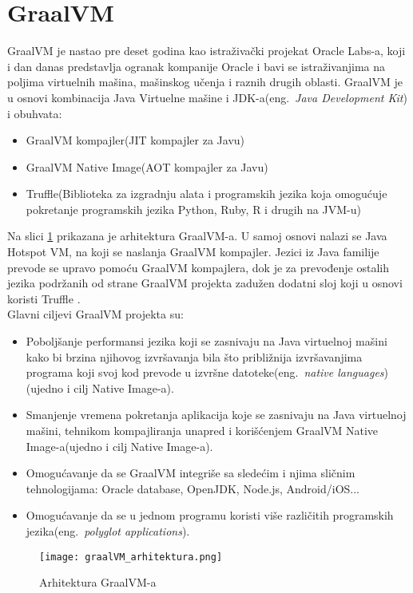 \documentclass[a4paper]{article}
\begin{document}
\section{GraalVM}
\label{sec:graalvm}
GraalVM je nastao pre deset godina kao istraživački projekat Oracle Labs-a, koji i dan danas predstavlja ogranak kompanije Oracle i bavi se istraživanjima na poljima virtuelnih mašina, mašinskog učenja i raznih drugih oblasti.
GraalVM je u osnovi kombinacija Java Virtuelne mašine i JDK-a(eng.~{\em Java Development Kit}) i obuhvata:
\begin{itemize}
    \item GraalVM kompajler(JIT kompajler za Javu)
    \item GraalVM Native Image(AOT kompajler za Javu)
    \item Truffle(Biblioteka za izgradnju alata i programskih jezika koja omogućuje pokretanje programskih jezika Python, Ruby, R i drugih na JVM-u)
\end{itemize} 
Na slici \ref{fig:arhitektura} prikazana je arhitektura GraalVM-a. U samoj osnovi nalazi se Java Hotspot VM, na koji se naslanja GraalVM kompajler. Jezici iz Java familije prevode se upravo pomoću GraalVM kompajlera, dok je za prevođenje ostalih jezika podržanih od strane GraalVM projekta zadužen dodatni sloj koji u osnovi koristi Truffle \cite{Arhitektura}. \\
Glavni ciljevi GraalVM projekta su:
\begin{itemize}
    \item Poboljšanje performansi jezika koji se zasnivaju na Java virtuelnoj mašini kako bi brzina njihovog izvršavanja bila što približnija izvršavanjima programa koji svoj kod prevode u izvršne datoteke(eng.~{\em native languages})(ujedno i cilj Native Image-a).
    \item Smanjenje vremena pokretanja aplikacija koje se zasnivaju na Java virtuelnoj mašini, tehnikom kompajliranja unapred i korišćenjem GraalVM Native Image-a(ujedno i cilj Native Image-a).
    \item Omogućavanje da se GraalVM integriše sa sledećim i njima sličnim tehnologijama: Oracle database, OpenJDK, Node.js, Android/iOS...
    \item Omogućavanje da se u jednom programu koristi više različitih programskih jezika(eng.~{\em polyglot applications}).
\end{itemize} 


\begin{figure}[h!]
\begin{center}
\texttt{[image: graalVM\_arhitektura.png]}
\end{center}
\caption{Arhitektura GraalVM-a}
\label{fig:arhitektura}
\end{figure}
\end{document}
